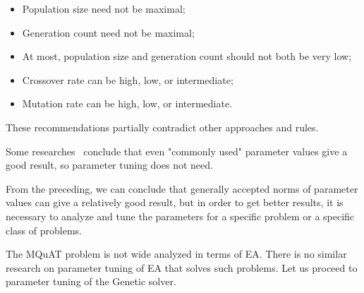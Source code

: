 \begin{itemize}
	\item Population size need not be maximal;
	\item Generation count need not be maximal;
	\item At most, population size and generation count should not both be very
	low;
	\item Crossover rate can be high, low, or intermediate;
	\item Mutation rate can be high, low, or intermediate.
\end{itemize}

These recommendations partially contradict other approaches and rules.  

Some researches~\cite{smit2009comparing, arcuri2013parameter} conclude that even "commonly used" parameter values give a good result, so parameter tuning does not need.

From the preceding, we can conclude that generally accepted norms of parameter values can give a relatively good result, but in order to get better results, it is necessary to analyze and tune the parameters for a specific problem or a specific class of problems.

The MQuAT problem is not wide analyzed in terms of EA. There is no similar research on parameter tuning of EA that solves such problems.  Let us proceed to parameter tuning of the Genetic solver.

